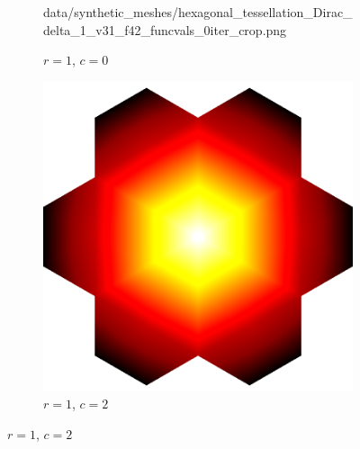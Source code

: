 \begin{figure}[ht]
\begin{subfigure}[b]{0.32\linewidth}
		{data/synthetic_meshes/hexagonal_tessellation_Dirac_delta_1_v31_f42_funcvals_0iter_crop.png}
		\caption{$r=1$, $c=0$}\label{fig:hex.b}
	\end{subfigure}
	\begin{subfigure}[b]{0.32\linewidth}
		\includegraphics[width=\linewidth]
		{data/synthetic_meshes/hexagonal_tessellation_Dirac_delta_1_v31_f42_funcvals_2iter_crop.png}
		\caption{$r=1$, $c=2$}\label{fig:hex.c}
	\end{subfigure}


\end{figure}
